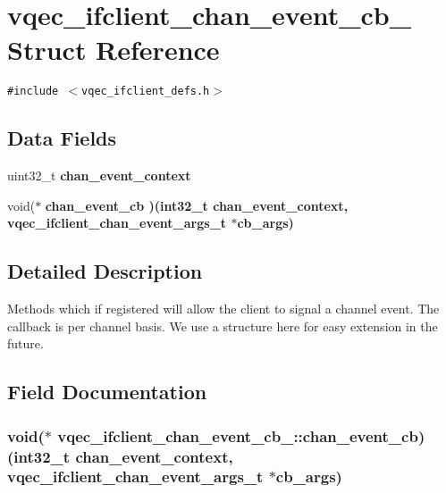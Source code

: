 \section{vqec\_\-ifclient\_\-chan\_\-event\_\-cb\_\- Struct Reference}
\label{structvqec__ifclient__chan__event__cb__}
{\tt \#include $<$vqec\_\-ifclient\_\-defs.h$>$}

\subsection*{Data Fields}
\begin{CompactItemize}
\item 
uint32\_\-t \bf{chan\_\-event\_\-context}
\item 
void($\ast$ \bf{chan\_\-event\_\-cb} )(int32\_\-t \bf{chan\_\-event\_\-context}, \bf{vqec\_\-ifclient\_\-chan\_\-event\_\-args\_\-t} $\ast$cb\_\-args)
\end{CompactItemize}


\subsection{Detailed Description}
Methods which if registered will allow the client to signal a channel event. The callback is per channel basis. We use a structure here for easy extension in the future. 



\subsection{Field Documentation}
\subsubsection{\setlength{\rightskip}{0pt plus 5cm}void($\ast$ \bf{vqec\_\-ifclient\_\-chan\_\-event\_\-cb\_\-::chan\_\-event\_\-cb})(int32\_\-t \bf{chan\_\-event\_\-context}, \bf{vqec\_\-ifclient\_\-chan\_\-event\_\-args\_\-t} $\ast$cb\_\-args)}\label{structvqec__ifclient__chan__event__cb___0df0a5c8398f8a4b70f52fa7c48b96d8}


